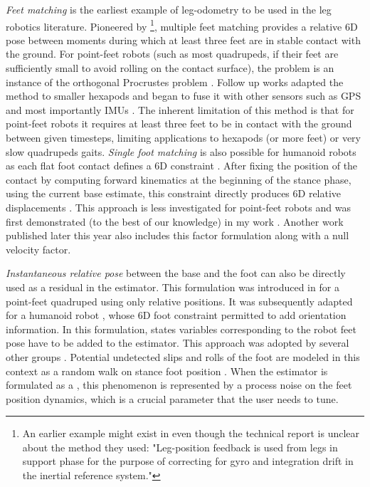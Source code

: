 \textit{Feet matching} is the earliest example of leg-odometry to be used in the leg robotics literature. Pioneered by \cite{roston1991dead} 
\footnote{An earlier example might exist in \cite{waldron1986adaptive} even though the technical report is unclear about the method they used: 
"Leg-position feedback is used from legs in support phase for the purpose of correcting for gyro and integration drift in the inertial reference system."},
multiple feet matching provides a relative 6D pose between moments during which at least three feet are in stable contact with the ground.
For point-feet robots (such as most quadrupeds, if their feet are sufficiently small to avoid rolling on the contact surface), the problem is an instance of the orthogonal Procrustes problem \cite{eggert1997estimating}.
Follow up works adapted the method to smaller hexapods \cite{lin2005leg} and began to fuse it with other sensors such as GPS \cite{gassmann2005localization, cobano2008location} 
and most importantly IMUs \cite{lin2006sensor, reinstein2011dead}.
The inherent limitation of this method is that for point-feet robots it requires at least three feet to be in contact with the ground between given timesteps, limiting
applications to hexapods (or more feet) or very slow quadrupeds gaits.
\textit{Single foot matching} is also possible for humanoid robots as each flat foot contact defines a 6D constraint \cite{bloesch2018technical}. 
After fixing the position of the contact by computing forward kinematics at the beginning of the stance phase, using the current base estimate, this constraint directly produces 6D 
relative displacements \cite{flayols2017experimental,xinjilefu2014decoupled,johnson2015team}. This approach is less investigated for point-feet robots and was first 
demonstrated (to the best of our knowledge) in my work \cite{fourmy2021contact}. Another work published later this year \cite{kim2021legged} also includes this 
factor formulation along with a null velocity factor. 

\textit{Instantaneous relative pose} between the base and the foot can also be directly used as a residual in the estimator. This formulation
was introduced in \cite{bloesch2013state, bloesch2013stateSlippery} for a point-feet quadruped using only relative positions. It was subsequently 
adapted for a humanoid robot \cite{rotella2014state}, whose 6D foot constraint permitted to add orientation information. In this formulation, 
states variables corresponding to the robot feet pose have to 
be added to the estimator. This approach was adopted by several other groups \cite{hartley2018legged, hartley2018hybrid, hartley2020contact, bledt2018cheetah}.
Potential undetected slips and rolls of the foot are modeled in this context as a random walk on stance foot position \cite{bloesch2013state,rotella2014state}. When the estimator is formulated as a 
\KalmanF \cite{kalman1960new}, this phenomenon is represented by a process noise on the feet position dynamics, which is a crucial parameter that the user needs to tune.

